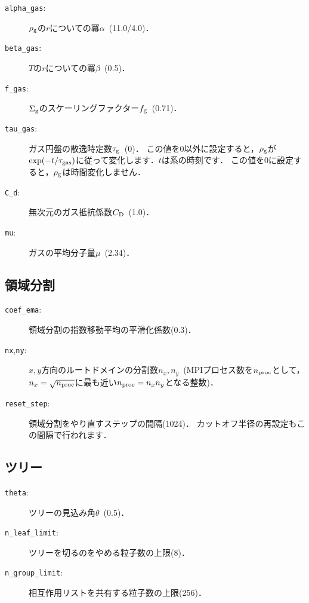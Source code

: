 \documentclass[12pt,a4paper,dvipdfmx]{jsarticle}
\begin{document}
\begin{description}
\item[\texttt{alpha\_gas}:]
$\rho_{\rm g}$の$r$についての冪$\alpha$\ (11.0/4.0)．
\item[\texttt{beta\_gas}:]
$T$の$r$についての冪$\beta$\ (0.5)．
\item[\texttt{f\_gas}:]
$\Sigma_{\rm g}$のスケーリングファクター$f_{\rm g}$\ (0.71)．
\item[\texttt{tau\_gas}:]
ガス円盤の散逸時定数$\tau_{\rm g}$\ (0)．
この値を$0$以外に設定すると，$\rho_{\rm g}$が$\exp(-t/\tau_{\rm gas})$に従って変化します．$t$は系の時刻です．
この値を$0$に設定すると，$\rho_{\rm g}$は時間変化しません．
\item[\texttt{C\_d}:]
無次元のガス抵抗係数$C_{\rm D}$\ (1.0)．
\item[\texttt{mu}:]
ガスの平均分子量$\mu$\ (2.34)．
\end{description}

\subsection{領域分割}
\begin{description}
\item[\texttt{coef\_ema}:]
領域分割の指数移動平均の平滑化係数(0.3)．
\item[\texttt{nx},\texttt{ny}:]
$x,y$方向のルートドメインの分割数$n_{x},n_{y}$\ (MPIプロセス数を$n_{\rm proc}$として，
$n_{x}=\sqrt{n_{\rm proc}}$に最も近い$n_{\rm proc}=n_{x}n_{y}$となる整数)．
\item[\texttt{reset\_step}:]
領域分割をやり直すステップの間隔(1024)．%
カットオフ半径の再設定もこの間隔で行われます．
\end{description}

\subsection{ツリー}
\begin{description}
\item[\texttt{theta}:]
ツリーの見込み角$\theta$\ (0.5)．
\item[\texttt{n\_leaf\_limit}:]
ツリーを切るのをやめる粒子数の上限(8)．
\item[\texttt{n\_group\_limit}:]
相互作用リストを共有する粒子数の上限(256)．
\end{description}
\end{document}
